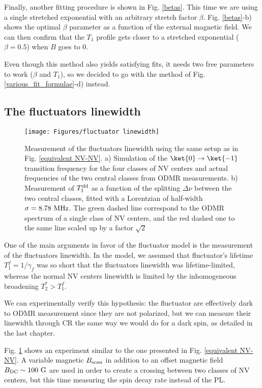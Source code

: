 \documentclass[a4paper,11pt]{report}
\begin{document}
Finally, another fitting procedure is shown in Fig. \ref{betas}. This time we are using a single stretched exponential with an arbitrary stretch factor $\beta$. Fig. \ref{betas}-b) shows the optimal $\beta$ parameter as a function of the external magnetic field. We can then confirm that the $T_1$ profile gets closer to a stretched exponential ($\beta=0.5$) when $B$ goes to 0. 

Even though this method also yields satisfying fits, it needs two free parameters to work ($\beta$ and $T_1$), so we decided to go with the method of Fig. \ref{various_fit_formulae}-d) instead.

\subsection{The fluctuators linewidth}

\begin{figure}[h]
\centering
\texttt{[image: Figures/fluctuator linewidth]}
\caption{Measurement of the fluctuators linewidth using the same setup as in Fig. \ref{equivalent NV-NV}. a) Simulation of the $\ket{0} \to \ket{-1}$ transition frequency for the four classes of NV centers and actual frequencies of the two central classes from ODMR measurements. b) Measurement of $T_1^{\rm dd}$ as a function of the splitting $\Delta \nu$ between the two central classes, fitted with a Lorentzian of half-width $\sigma=8.78\ \rm MHz$. The green dashed line correspond to the ODMR spectrum of a single class of NV centers, and the red dashed one to the same line scaled up by a factor $\sqrt{2}$}
\label{fluct linewidth}
\end{figure}

One of the main arguments in favor of the fluctuator model is the measurement of the fluctuators linewidth. In the model, we assumed that fluctuator's lifetime $T_1^f=1/\gamma_f$ was so short that the fluctuators linewidth was lifetime-limited, whereas the normal NV centers linewidth is limited by the inhomogeneous broadening $T_2^*>T_1^f$.

We can experimentally verify this hypothesis: the fluctuator are effectively dark to ODMR measurement since they are not polarized, but we can measure their linewidth through CR the same way we would do for a dark spin, as detailed in the last chapter.

Fig. \ref{fluct linewidth} shows an experiment similar to the one presented in Fig. \ref{equivalent NV-NV}. A variable magnetic $B_{\rm scan}$ in addition to an offset magnetic field $B_{\rm DC} \sim 100\ \rm G$ are used in order to create a crossing between two classes of NV centers, but this time measuring the spin decay rate instead of the PL.
\end{document}
